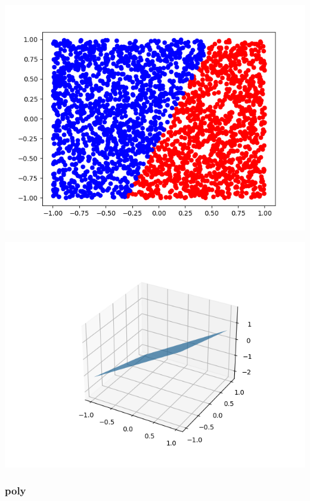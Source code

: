 \documentclass[11pt]{article}
\begin{document}
\begin{center}
\includegraphics[scale=0.7]{./res/ac_points_linear_0.25.png}
\end{center}

\begin{center}
\includegraphics[scale=0.7]{./res/ac_surface_linear_0.25.png}
\end{center}

\subsubsection*{poly}
\label{sec:org12d4751}
\end{document}
